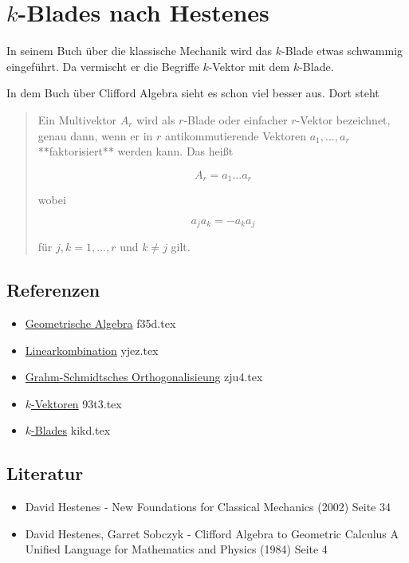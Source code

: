 \documentclass{sajzk}
\begin{document}
\section{\texorpdfstring{$k$-Blades nach Hestenes}{k-Blades nach Hestenes}}
\label{piun}

In seinem Buch über die klassische Mechanik wird das $k$-Blade etwas schwammig
eingeführt. Da vermischt er die Begriffe $k$-Vektor mit dem $k$-Blade.

In dem Buch über Clifford Algebra sieht es schon viel besser aus. Dort steht

\begin{quote}
Ein Multivektor $A_r$ wird als $r$-Blade oder einfacher $r$-Vektor
bezeichnet, genau dann, wenn er in $r$ antikommutierende Vektoren
$a_1,...,a_r$ **faktorisiert** werden kann. Das heißt

$$
A_r=a_1...a_r
$$

wobei

$$
a_ja_k=-a_ka_j
$$

für $j,k=1,...,r$ und $k\neq j$ gilt.
\end{quote}

\subsection{Referenzen} 
\begin{itemize}
    \item \href{f35d.pdf}{Geometrische Algebra} f35d.tex
    \item \href{yjez.pdf}{Linearkombination} yjez.tex
    \item \href{zju4.pdf}{Grahm-Schmidtsches Orthogonalisieung} zju4.tex
    \item \href{93t3.pdf}{$k$-Vektoren} 93t3.tex
    \item \href{kikd.pdf}{$k$-Blades} kikd.tex
\end{itemize}

\subsection{Literatur}
\begin{itemize}
    \item David Hestenes - New Foundations for Classical Mechanics (2002) Seite 34
    \item David Hestenes, Garret Sobczyk - Clifford Algebra to Geometric Calculus A
          Unified Language for Mathematics and Physics (1984) Seite 4
\end{itemize}
\end{document}
